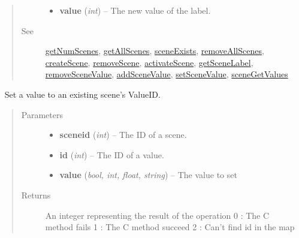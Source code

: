 \documentclass[letterpaper,10pt,english]{sphinxmanual}
\begin{document}
\begin{fulllineitems}
\begin{fulllineitems}
\begin{quote}
\begin{description}
\begin{itemize}
\item {} 
\textbf{value} (\emph{int}) -- The new value of the label.

\end{itemize}

\item[{See}] \leavevmode
{\hyperref[libopenzwave:getnumscenes]{getNumScenes}}, {\hyperref[libopenzwave:getallscenes]{getAllScenes}}, {\hyperref[libopenzwave:sceneexists]{sceneExists}}, {\hyperref[libopenzwave:removeallscenes]{removeAllScenes}}, {\hyperref[libopenzwave:createscene]{createScene}}, {\hyperref[libopenzwave:removescene]{removeScene}}, {\hyperref[libopenzwave:activatescene]{activateScene}}, {\hyperref[libopenzwave:getscenelabel]{getSceneLabel}}, {\hyperref[libopenzwave:removescenevalue]{removeSceneValue}}, {\hyperref[libopenzwave:addscenevalue]{addSceneValue}}, {\hyperref[libopenzwave:setscenevalue]{setSceneValue}}, {\hyperref[libopenzwave:scenegetvalues]{sceneGetValues}}

\end{description}\end{quote}

\end{fulllineitems}


\begin{fulllineitems}
\label{libopenzwave:libopenzwave.PyManager.setSceneValue}~\label{libopenzwave:setscenevalue}
Set a value to an existing scene's ValueID.
\begin{quote}\begin{description}
\item[{Parameters}] \leavevmode\begin{itemize}
\item {} 
\textbf{sceneid} (\emph{int}) -- The ID of a scene.

\item {} 
\textbf{id} (\emph{int}) -- The ID of a value.

\item {} 
\textbf{value} (\emph{bool, int, float, string}) -- The value to set

\end{itemize}

\item[{Returns}] \leavevmode
An integer representing the result of the operation
0 : The C method fails
1 : The C method succeed
2 : Can't find id in the map


\end{description}
\end{quote}
\end{fulllineitems}
\end{fulllineitems}
\end{document}
